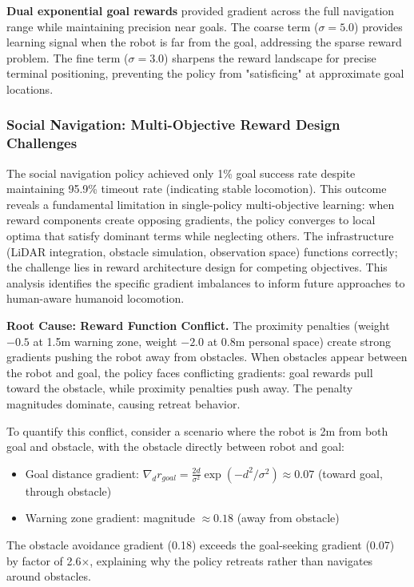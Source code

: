 \documentclass[12pt,a4paper]{article}
\begin{document}
\textbf{Dual exponential goal rewards} provided gradient across the full navigation range while maintaining precision near goals. The coarse term ($\sigma=5.0$) provides learning signal when the robot is far from the goal, addressing the sparse reward problem. The fine term ($\sigma=3.0$) sharpens the reward landscape for precise terminal positioning, preventing the policy from "satisficing" at approximate goal locations.

\subsubsection{Social Navigation: Multi-Objective Reward Design Challenges}
\label{sec:social_nav_failure_analysis}

The social navigation policy achieved only 1\% goal success rate despite maintaining 95.9\% timeout rate (indicating stable locomotion). This outcome reveals a fundamental limitation in single-policy multi-objective learning: when reward components create opposing gradients, the policy converges to local optima that satisfy dominant terms while neglecting others. The infrastructure (LiDAR integration, obstacle simulation, observation space) functions correctly; the challenge lies in reward architecture design for competing objectives. This analysis identifies the specific gradient imbalances to inform future approaches to human-aware humanoid locomotion.

\textbf{Root Cause: Reward Function Conflict.} The proximity penalties (weight $-0.5$ at 1.5m warning zone, weight $-2.0$ at 0.8m personal space) create strong gradients pushing the robot away from obstacles. When obstacles appear between the robot and goal, the policy faces conflicting gradients: goal rewards pull toward the obstacle, while proximity penalties push away. The penalty magnitudes dominate, causing retreat behavior.

To quantify this conflict, consider a scenario where the robot is 2m from both goal and obstacle, with the obstacle directly between robot and goal:
\begin{itemize}
    \item Goal distance gradient: $\nabla_d r_{goal} = \frac{2d}{\sigma^2} \exp(-d^2/\sigma^2) \approx 0.07$ (toward goal, through obstacle)
    \item Warning zone gradient: magnitude $\approx 0.18$ (away from obstacle)
\end{itemize}
The obstacle avoidance gradient (0.18) exceeds the goal-seeking gradient (0.07) by factor of 2.6$\times$, explaining why the policy retreats rather than navigates around obstacles.
\end{document}
